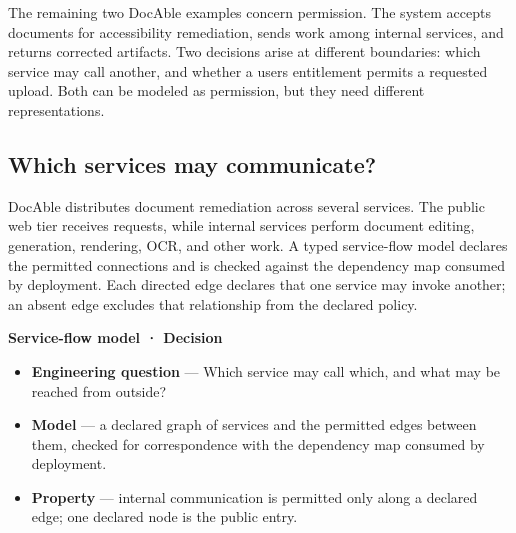 The remaining two DocAble examples concern permission. The system accepts documents for accessibility remediation, sends work among internal services, and returns corrected artifacts. Two decisions arise at different boundaries: which service may call another, and whether a user\textquotesingle s entitlement permits a requested upload. Both can be modeled as permission, but they need different representations.

\subsection{Which services may communicate?}\label{heading:which-services-may-communicate}

DocAble distributes document remediation across several services. The public web tier receives requests, while internal services perform document editing, generation, rendering, OCR, and other work. A typed service-flow model declares the permitted connections and is checked against the dependency map consumed by deployment. Each directed edge declares that one service may invoke another; an absent edge excludes that relationship from the declared policy.

\textbf{Service-flow model · Decision}

\begin{itemize}
\tightlist
\item
  \textbf{Engineering question} --- Which service may call which, and what may be reached from outside?
\end{itemize}

\begin{itemize}
\tightlist
\item
  \textbf{Model} --- a declared graph of services and the permitted edges between them, checked for correspondence with the dependency map consumed by deployment.
\end{itemize}

\begin{itemize}
\tightlist
\item
  \textbf{Property} --- internal communication is permitted only along a declared edge; one declared node is the public entry.
\end{itemize}

